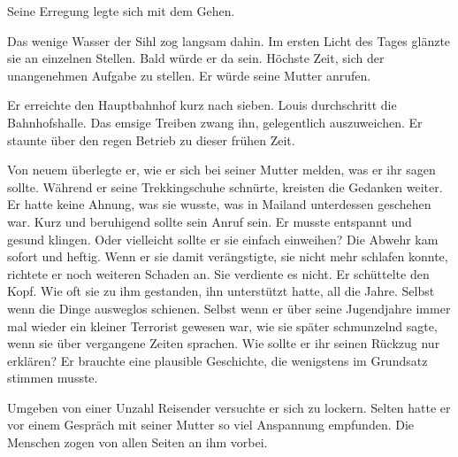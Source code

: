 Seine Erregung legte sich mit dem Gehen.

\sectionbreak

Das wenige Wasser der Sihl zog langsam dahin. Im ersten Licht
des Tages glänzte sie an einzelnen Stellen. Bald würde er da sein.
Höchste Zeit, sich der unangenehmen Aufgabe zu stellen. Er 
würde seine Mutter anrufen.

Er erreichte den Hauptbahnhof kurz nach sieben. Louis durchschritt die
Bahnhofshalle. Das emsige Treiben zwang ihn, gelegentlich auszuweichen.
Er staunte über den regen Betrieb zu dieser frühen Zeit.

Von neuem überlegte er, wie er sich bei seiner Mutter melden, was er ihr sagen
sollte. Während er seine Trekkingschuhe schnürte, kreisten die
Gedanken weiter. Er hatte keine Ahnung, was sie wusste, was in Mailand
unterdessen geschehen war. Kurz und beruhigend sollte sein Anruf sein.
Er musste entspannt und gesund klingen. Oder vielleicht sollte er sie
einfach einweihen? Die Abwehr kam sofort und heftig. Wenn er sie damit
verängstigte, sie nicht mehr schlafen konnte, richtete er noch weiteren
Schaden an. Sie verdiente es nicht. Er schüttelte den Kopf. 
Wie oft sie zu ihm gestanden, ihn unterstützt hatte, all die Jahre.
Selbst wenn die Dinge ausweglos schienen. Selbst wenn er über seine
Jugendjahre immer mal wieder ein kleiner Terrorist gewesen war, wie sie später schmunzelnd 
sagte, wenn sie über vergangene Zeiten sprachen.
Wie sollte er ihr seinen Rückzug nur erklären? Er brauchte eine plausible Geschichte, die wenigstens im Grundsatz stimmen musste.  

Umgeben von einer Unzahl Reisender versuchte er sich zu lockern. Selten hatte er vor einem Gespräch mit seiner Mutter so viel Anspannung empfunden. 
Die Menschen zogen von allen Seiten an ihm vorbei.

\sectionbreak

